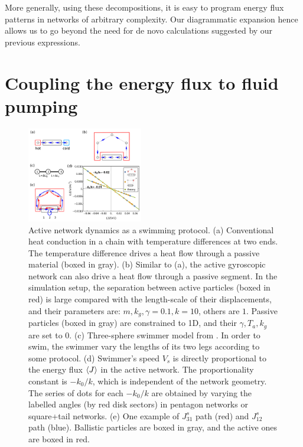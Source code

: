 \documentclass[
 preprint,
 preprintnumbers,
 amsmath,amssymb,
 aps,
 pre,
 longbibliography,
 superscriptaddress,
 10pt, twocolumn
]{revtex4-1}
\begin{document}
More generally, using these decompositions, it is easy to program energy flux patterns in networks of arbitrary complexity. Our diagrammatic expansion hence allows us to go beyond the need for de novo calculations suggested by our previous expressions.


\section{Coupling the energy flux to fluid pumping} \label{sec:swimmer}

\begin{figure}[ht]
	\centering
	\includegraphics[width=0.45\textwidth]{7_swimmer.pdf}
    \caption{Active network dynamics as a swimming protocol.
    (a) Conventional heat conduction in a chain with temperature differences at two ends. The temperature difference drives a heat flow through a passive material (boxed in gray).
    (b) Similar to (a), the active gyroscopic network can also drive a heat flow through a passive segment. In the simulation setup, the separation between active particles (boxed in red) is large compared with the length-scale of their displacements, and their parameters are: $m,k_g,\gamma=0.1, k=10$, others are $1$. Passive particles (boxed in gray) are constrained to 1D, and their $\gamma,T_a,k_g$ are set to $0$.
    (c) Three-sphere swimmer model from \cite{Golestanian2008AnalyticResults}. In order to swim, the swimmer vary the lengths of its two legs according to some protocol.
    (d) Swimmer's speed $V_s$ is directly proportional to the energy flux $\expval{J}$ in the active network. The proportionality constant is $-k_0/k$, which is independent of the network geometry. The series of dots for each $-k_0/k$ are obtained by varying the labelled angles (by red disk sectors) in pentagon networks or square+tail networks.
    (e) One example of $J_{31}^s$ path (red) and $J_{12}^s$ path (blue). Ballistic particles are boxed in gray, and the active ones are boxed in red.
    }
    \label{fig:swimmer}
\end{figure}
\end{document}
